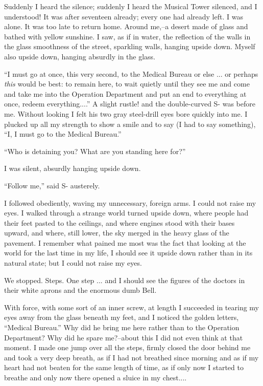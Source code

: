 \documentclass[11pt,openany]{book}
\begin{document}
Suddenly I heard the silence; suddenly I heard the Musical Tower silenced, and I understood! It was after seventeen already; every one had already left. I was alone. It was too late to return home. Around me,--a desert made of glass and bathed with yellow sunshine. I saw, as if in water, the reflection of the walls in the glass smoothness of the street, sparkling walls, hanging upside down. Myself also upside down, hanging absurdly in the glass.

``I must go at once, this very second, to the Medical Bureau or else ... or perhaps \emph{this} would be best: to remain here, to wait quietly until they see me and come and take me into the Operation Department and put an end to everything at once, redeem everything....'' A slight rustle! and the double-curved S- was before me. Without looking I felt his two gray steel-drill eyes bore quickly into me. I plucked up all my strength to show a smile and to say (I had to say something), ``I, I must go to the Medical Bureau.''

``Who is detaining you? What are you standing here for?''

I was silent, absurdly hanging upside down.

``Follow me,'' said S- austerely.

I followed obediently, waving my unnecessary, foreign arms. I could not raise my eyes. I walked through a strange world turned upside down, where people had their feet pasted to the ceilings, and where engines stood with their bases upward, and where, still lower, the sky merged in the heavy glass of the pavement. I remember what pained me most was the fact that looking at the world for the last time in my life, I should see it upside down rather than in its natural state; but I could not raise my eyes.

We stopped. Steps. One step ... and I should see the figures of the doctors in their white aprons and the enormous dumb Bell.

With force, with some sort of an inner screw, at length I succeeded in tearing my eyes away from the glass beneath my feet, and I noticed the golden letters, ``Medical Bureau.'' Why did he bring me here rather than to the Operation Department? Why did he spare me?--about this I did not even think at that moment. I made one jump over all the steps, firmly closed the door behind me and took a very deep breath, as if I had not breathed since morning and as if my heart had not beaten for the same length of time, as if only now I started to breathe and only now there opened a sluice in my chest....
\end{document}
